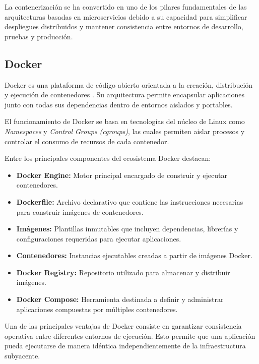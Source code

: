 \documentclass[12pt, oneside, letterpaper]{book}
\begin{document}
La contenerización se ha convertido en uno de los pilares fundamentales de las arquitecturas basadas en microservicios debido a su capacidad para simplificar despliegues distribuidos y mantener consistencia entre entornos de desarrollo, pruebas y producción.

\subsection{Docker}

Docker es una plataforma de código abierto orientada a la creación, distribución y ejecución de contenedores \cite{58}. Su arquitectura permite encapsular aplicaciones junto con todas sus dependencias dentro de entornos aislados y portables.

El funcionamiento de Docker se basa en tecnologías del núcleo de Linux como \textit{Namespaces} y \textit{Control Groups (cgroups)}, las cuales permiten aislar procesos y controlar el consumo de recursos de cada contenedor.

Entre los principales componentes del ecosistema Docker destacan:

\begin{itemize}

\item \textbf{Docker Engine:} Motor principal encargado de construir y ejecutar contenedores.

\item \textbf{Dockerfile:} Archivo declarativo que contiene las instrucciones necesarias para construir imágenes de contenedores.

\item \textbf{Imágenes:} Plantillas inmutables que incluyen dependencias, librerías y configuraciones requeridas para ejecutar aplicaciones.

\item \textbf{Contenedores:} Instancias ejecutables creadas a partir de imágenes Docker.

\item \textbf{Docker Registry:} Repositorio utilizado para almacenar y distribuir imágenes.

\item \textbf{Docker Compose:} Herramienta destinada a definir y administrar aplicaciones compuestas por múltiples contenedores.
\end{itemize}

Una de las principales ventajas de Docker consiste en garantizar consistencia operativa entre diferentes entornos de ejecución. Esto permite que una aplicación pueda ejecutarse de manera idéntica independientemente de la infraestructura subyacente.
\end{document}
